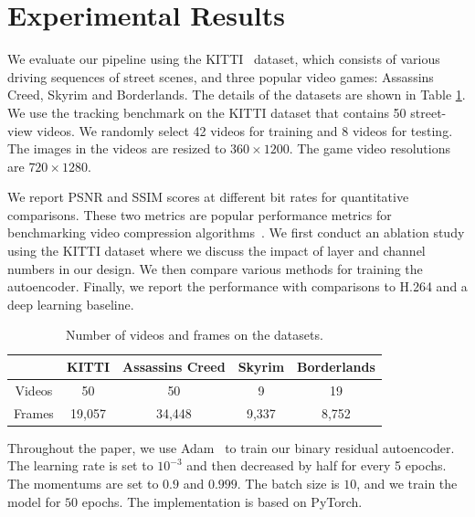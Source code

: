 \documentclass[letterpaper]{article} %
\begin{document}
	
	\section{Experimental Results}
	
	We evaluate our pipeline using the KITTI~\cite{Geiger_CVPR_2012} dataset, which consists of various driving sequences of street scenes, and three popular video games: Assassins Creed, Skyrim and Borderlands. The details of the datasets are shown in Table \ref{tab:dataset}. We use the tracking benchmark on the KITTI dataset that contains 50 street-view videos. We randomly select 42 videos for training and 8 videos for testing. The images in the videos are resized to $360 \times 1200$. The game video resolutions are $720 \times 1280$.
	
	We report PSNR and SSIM scores at different bit rates for quantitative comparisons. These two metrics are popular performance metrics for benchmarking video compression algorithms~\cite{Wang_TIP_2004}. We first conduct an ablation study using the KITTI dataset where we discuss the impact of layer and channel numbers in our design. We then compare various methods for training the autoencoder. Finally, we report the performance with comparisons to H.264 and a deep learning baseline.
	\begin{table}[t]
		\caption{Number of videos and frames on the datasets.
		}
		\small
		\centering   
		\begin{tabular}{ccccc}
			\toprule
			& KITTI & Assassins Creed & Skyrim & Borderlands \\
			\hline
			
			Videos & 50 & 50 & 9 & 19 \\
			\hline
			
			Frames & 19,057 & 34,448 & 9,337 & 8,752\\		
			\bottomrule
		\end{tabular}
		\label{tab:dataset}
	\end{table}
	{} Throughout the paper, we use Adam~\cite{Kingma_ICLR_2015} to train our binary residual autoencoder. The learning rate is set to $10^{-3}$ and then decreased by half for every 5 epochs. The momentums are set to $0.9$ and $0.999$. The batch size is $10$, and we train the model for $50$ epochs. The implementation is based on PyTorch.
	
\end{document}
